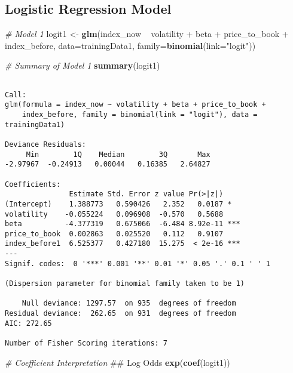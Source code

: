 \documentclass[12pt,twoside]{reedthesis}
\newenvironment{Shaded}{\begin{snugshade}}{\end{snugshade}}
\newcommand{\KeywordTok}[1]{\textcolor[rgb]{0.13,0.29,0.53}{\textbf{{#1}}}}
\newcommand{\DataTypeTok}[1]{\textcolor[rgb]{0.13,0.29,0.53}{{#1}}}
\newcommand{\StringTok}[1]{\textcolor[rgb]{0.31,0.60,0.02}{{#1}}}
\newcommand{\CommentTok}[1]{\textcolor[rgb]{0.56,0.35,0.01}{\textit{{#1}}}}
\newcommand{\NormalTok}[1]{{#1}}
\theoremstyle{definition}
\theoremstyle{definition}
\theoremstyle{definition}
\theoremstyle{remark}
\begin{document}
\subsection{Logistic Regression
Model}\label{logistic-regression-model-1}
\begin{Shaded}
\begin{Highlighting}[]
\CommentTok{# Model 1}
\NormalTok{logit1 <-}\StringTok{ }\KeywordTok{glm}\NormalTok{(index_now ~}\StringTok{  }\NormalTok{volatility +}\StringTok{ }\NormalTok{beta +}\StringTok{ }\NormalTok{price_to_book +}\StringTok{ }
\NormalTok{index_before, }\DataTypeTok{data=}\NormalTok{trainingData1, }\DataTypeTok{family=}\KeywordTok{binomial}\NormalTok{(}\DataTypeTok{link=}\StringTok{"logit"}\NormalTok{))}

\CommentTok{# Summary of Model 1}
\KeywordTok{summary}\NormalTok{(logit1)}
\end{Highlighting}
\end{Shaded}
\begin{verbatim}

Call:
glm(formula = index_now ~ volatility + beta + price_to_book + 
    index_before, family = binomial(link = "logit"), data = trainingData1)

Deviance Residuals: 
     Min        1Q    Median        3Q       Max  
-2.97967  -0.24913   0.00044   0.16385   2.64827  

Coefficients:
               Estimate Std. Error z value Pr(>|z|)    
(Intercept)    1.388773   0.590426   2.352   0.0187 *  
volatility    -0.055224   0.096908  -0.570   0.5688    
beta          -4.377319   0.675066  -6.484 8.92e-11 ***
price_to_book  0.002863   0.025520   0.112   0.9107    
index_before1  6.525377   0.427180  15.275  < 2e-16 ***
---
Signif. codes:  0 '***' 0.001 '**' 0.01 '*' 0.05 '.' 0.1 ' ' 1

(Dispersion parameter for binomial family taken to be 1)

    Null deviance: 1297.57  on 935  degrees of freedom
Residual deviance:  262.65  on 931  degrees of freedom
AIC: 272.65

Number of Fisher Scoring iterations: 7
\end{verbatim}
\begin{Shaded}
\begin{Highlighting}[]
\CommentTok{# Coefficient Interpretation}
\NormalTok{## Log Odds}
\KeywordTok{exp}\NormalTok{(}\KeywordTok{coef}\NormalTok{(logit1))}
\end{Highlighting}
\end{Shaded}
\end{document}
